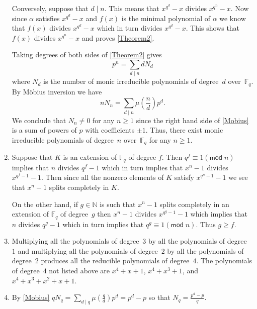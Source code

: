 \documentclass[12pt]{article}
\renewcommand{\pmod}[1]{\left(\mathsf{mod}\;#1\right)}
\begin{document}
\begin{enumerate}
Conversely, suppose that $d\mid n$. This means that $x^{q^d}-x$
divides $x^{q^n}-x$. Now since $\alpha$ satisfies $x^{q^d}-x$
and $f\left(x\right)$ is the minimal polynomial of $\alpha$
we know that $f\left(x\right)$ divides $x^{q^d}-x$ which in
turn divides $x^{q^d}-x$. This shows that $f\left(x\right)$
divides $x^{q^n}-x$ and proves \autoref{Theorem2}.

Taking degrees of both sides of \autoref{Theorem2} gives
\[p^n=\sum_{d\mid n}dN_d\]
where $N_d$ is the number of monic irreducible polynomials
of degree~$d$ over~$\mathbb{F}_q$.
By M\"obius inversion we have
\begin{equation}\label{Mobius}
nN_n=\sum_{d\mid n}\mu\left(\frac{n}{d}\right)p^d.
\end{equation}
We conclude that $N_n\ne 0$ for any $n\ge 1$ since
the right hand side of \autoref{Mobius} is a sum
of powers of $p$ with coefficients $\pm 1$.
Thus, there exist monic irreducible polynomials of degree~$n$
over~$\mathbb{F}_q$ for any $n\ge 1$.

\item %
Suppose that $K$ is an extension of $\mathbb{F}_q$ of degree $f$. Then
$q^f\equiv 1\pmod{n}$ implies that $n$ divides $q^f-1$
which in turn implies that $x^n-1$ divides $x^{q^f-1}-1$.
Then since all the nonzero elements of $K$ satisfy $x^{q^n-1}-1$
we see that $x^n-1$ splits completely in $K$.

On the other hand, if $g\in\mathbb{N}$ is such that
$x^n-1$ splits completely in an extension of $\mathbb{F}_q$
of degree~$g$ then $x^n-1$ divides $x^{q^g-1}-1$
which implies that $n$ divides $q^g-1$ which in turn implies
that $q^g\equiv 1\pmod{n}$. Thus $g\ge f$.

\item %
Multiplying all the polynomials of degree~$3$ by all the polynomials
of degree~$1$ and multiplying all the polynomials of degree~$2$
by all the polynomials of degree~$2$
produces all the reducible polynomials of degree~$4$.
The polynomials of degree~$4$ not listed above are
$x^4+x+1$, $x^4+x^3+1$, and $x^4+x^3+x^2+x+1$.

\item %
By \autoref{Mobius}
$qN_q=\sum_{d\mid q}\mu\left(\frac{q}{d}\right)p^d
=p^d-p$ so that $N_q=\frac{p^d-p}{q}$.
\end{enumerate}
\end{document}
